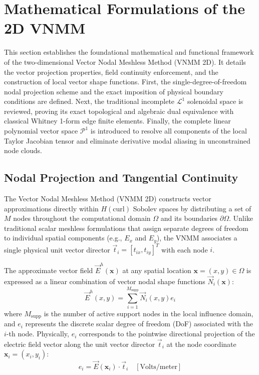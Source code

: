 \documentclass[preprint,12pt]{elsarticle}
\begin{document}
\section{Mathematical Formulations of the 2D VNMM}
\label{sec:formulations}

This section establishes the foundational mathematical and functional framework of the two-dimensional Vector Nodal Meshless Method (VNMM 2D). It details the vector projection properties, field continuity enforcement, and the construction of local vector shape functions. First, the single-degree-of-freedom nodal projection scheme and the exact imposition of physical boundary conditions are defined. Next, the traditional incomplete $\mathcal{L}^1$ solenoidal space is reviewed, proving its exact topological and algebraic dual equivalence with classical Whitney 1-form edge finite elements. Finally, the complete linear polynomial vector space $\mathcal{P}^1$ is introduced to resolve all components of the local Taylor Jacobian tensor and eliminate derivative modal aliasing in unconstrained node clouds.

\subsection{Nodal Projection and Tangential Continuity}
\label{subsec:nodal_projection}

The Vector Nodal Meshless Method (VNMM 2D) \cite{ortiz2021nodal, ortiz2023tese} constructs vector approximations directly within $H(\mathrm{curl})$ Sobolev spaces by distributing a set of $M$ nodes throughout the computational domain $\Omega$ and its boundaries $\partial\Omega$. Unlike traditional scalar meshless formulations that assign separate degrees of freedom to individual spatial components (e.g., $E_x$ and $E_y$), the VNMM associates a single physical unit vector director $\vec{t}_i = [t_{ix}, t_{iy}]^T$ with each node $i$.

The approximate vector field $\vec{E}^h(\mathbf{x})$ at any spatial location $\mathbf{x} = (x, y) \in \Omega$ is expressed as a linear combination of vector nodal shape functions $\vec{N}_i(\mathbf{x})$:
\begin{equation}
\vec{E}^h(x, y) = \sum_{i=1}^{M_{\text{supp}}} \vec{N}_i(x, y) e_i
\label{eq:field_approx_vnmm}
\end{equation}
where $M_{\text{supp}}$ is the number of active support nodes in the local influence domain, and $e_i$ represents the discrete scalar degree of freedom (DoF) associated with the $i$-th node. Physically, $e_i$ corresponds to the pointwise directional projection of the electric field vector along the unit vector director $\vec{t}_i$ at the node coordinate $\mathbf{x}_i = (x_i, y_i)$:
\begin{equation}
e_i = \vec{E}(\mathbf{x}_i) \cdot \vec{t}_i \quad [\text{Volts/meter}]
\label{eq:dof_projection_definition}
\end{equation}
\end{document}
